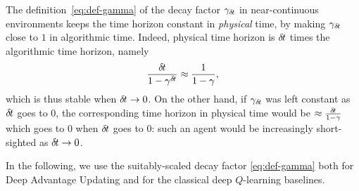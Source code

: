 The definition~\eqref{eq:def-gamma} of the decay factor $\gamma_{\delta\hspace{-.1em}t}$ in
near-continuous environments keeps the time horizon constant in
\emph{physical} time, by making $\gamma_{\delta\hspace{-.1em}t}$ close to $1$ in
algorithmic time. Indeed, physical time horizon is ${\delta\hspace{-.1em}t}$ times the
algorithmic time horizon, namely
\begin{equation}
          \label{eq:time-horizon}
          \frac{{\delta\hspace{-.1em}t}}{1-\gamma^{\delta\hspace{-.1em}t}}
          \approx \frac{1}{1-\gamma},
        \end{equation}
which is thus stable when ${\delta\hspace{-.1em}t}\to 0$.
On the other hand,
if $\gamma_{\delta\hspace{-.1em}t}$ was left constant
as ${\delta\hspace{-.1em}t}$ goes to $0$, the corresponding time horizon in physical time
would be $\approx \frac{{\delta\hspace{-.1em}t}}{1 - \gamma}$ which goes to $0$ when
${\delta\hspace{-.1em}t}$ goes to $0$: such an agent would be increasingly short-sighted
as ${\delta\hspace{-.1em}t}\to 0$.

In the following, we use the suitably-scaled decay factor
\eqref{eq:def-gamma} both for Deep Advantage Updating and for the
classical deep $Q$-learning baselines.
%       
        


